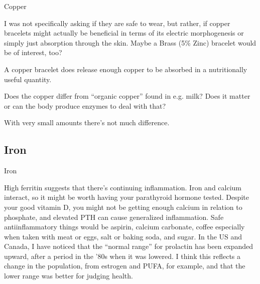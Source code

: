 \documentclass[11pt,oneside,openany,extrafontsizes]{memoir}
\begin{document}
\begin{emailexchange}{Copper}

    \begin{question}
        I was not specifically asking if they are safe to wear, but rather, if copper bracelets might actually be beneficial in terms of its electric morphogenesis or simply just absorption through the skin. Maybe a Brass (5\% Zinc) bracelet would be of interest, too?
    \end{question}

    \begin{answer}
      A copper bracelet does release enough copper to be absorbed in a nutritionally useful quantity.
    \end{answer}

    \begin{question}
        Does the copper differ from \enquote{organic copper} found in e.g. milk? Does it matter or can the body produce enzymes to deal with that?
    \end{question}

    \begin{answer}
      With very small amounts there's not much difference.
    \end{answer}
\end{emailexchange}

\subsection{Iron}

\begin{standalonequote}{Iron}

    \begin{answer}
        High ferritin suggests that there's continuing inflammation. Iron and calcium interact, so it might be worth having your parathyroid hormone tested. Despite your good vitamin D, you might not be getting enough calcium in relation to phosphate, and elevated PTH can cause generalized inflammation. Safe antiinflammatory things would be aspirin, calcium carbonate, coffee especially when taken with meat or eggs, salt or baking soda, and sugar. In the US and Canada, I have noticed that the \enquote{normal range} for prolactin has been expanded upward, after a period in the '80s when it was lowered. I think this reflects a change in the population, from estrogen and PUFA, for example, and that the lower range was better for judging health.
    \end{answer}
\end{standalonequote}
\end{document}
